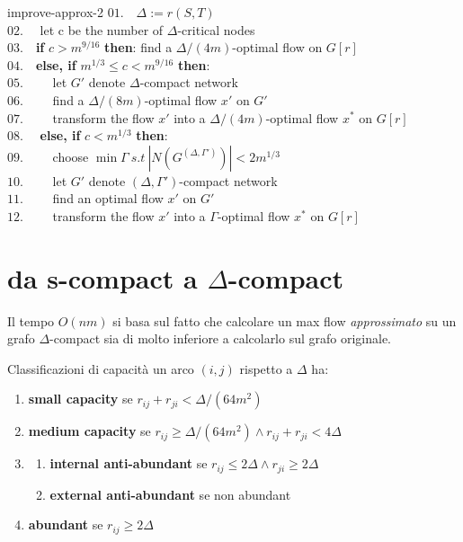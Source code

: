 \documentclass[a4paper, 11pt]{report}
\begin{document}
\newpage
\begin{algo}{improve-approx-2}{}
    $01.\quad \Delta := r(S,T)$\\
    $02.\quad$ let c be the number of $\Delta$-critical nodes\\
    $03.\quad$\textbf{if} $c>m^{9/16}$ \textbf{then}: find a $\Delta/(4m)$-optimal flow on $G[r]$\\
    $04.\quad$\textbf{else, if} $m^{1/3}\le c<m^{9/16}$ \textbf{then}:\\
    $05.\qquad$ let $G'$ denote $\Delta$-compact network\\
    $06.\qquad$ find a $\Delta/(8m)$-optimal flow $x'$ on $G'$\\
    $07.\qquad$ transform the flow $x'$ into a $\Delta/(4m)$-optimal flow $x^*$ on $G[r]$\\
    $08.\quad$ \textbf{else, if} $c < m^{1/3}$ \textbf{then}: \\
    $09.\qquad$ choose  $\min \Gamma\ s.t\  |N(G^{(\Delta, \Gamma')})| < 2m^{1/3}$\\
    $10.\qquad$ let $G'$ denote $(\Delta, \Gamma')$-compact network\\
    $11.\qquad$ find an optimal flow $x'$ on $G'$\\
    $12.\qquad$ transform the flow $x'$ into a $\Gamma$-optimal flow $x^*$ on $G[r]$\\

            
    
    
\end{algo}


\section{da s-compact a $\Delta$-compact}
Il tempo $O(nm)$ si basa sul fatto che calcolare un max flow \textit{approssimato} su un grafo $\Delta$-compact sia di molto inferiore a calcolarlo sul grafo originale.
\begin{definition}{Classificazioni di capacità}{}
    un arco $(i,j)$ rispetto a $\Delta$ ha:
    \begin{enumerate}
        \item \textbf{small capacity} se $r_{ij}+r_{ji} < \Delta/(64m^2)$
        \item \textbf{medium capacity} se $r_{ij} \ge \Delta/(64m^2) \land r_{ij}+r_{ji} < 4\Delta$
        \item \begin{enumerate}
            \item \textbf{internal anti-abundant} se $r_{ij} \le 2\Delta \land r_{ji} \ge 2\Delta$
            \item \textbf{external anti-abundant} se non abundant 
        \end{enumerate}
        \item \textbf{abundant} se $r_{ij} \ge 2\Delta$
    \end{enumerate}
    
\end{definition}
\end{document}
